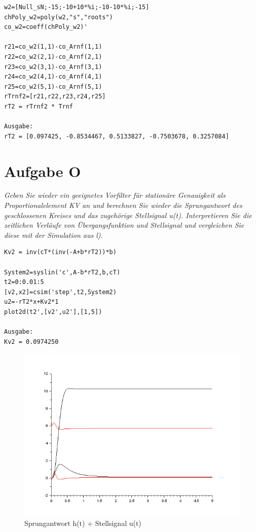 \begin{lstlisting}[caption = Polvorgabe, captionpos = b, label = lst:example]
w2=[Null_sN;-15;-10+10*%i;-10-10*%i;-15]       
chPoly_w2=poly(w2,"s","roots")            
co_w2=coeff(chPoly_w2)'                   
    
r21=co_w2(1,1)-co_Arnf(1,1)
r22=co_w2(2,1)-co_Arnf(2,1)
r23=co_w2(3,1)-co_Arnf(3,1)
r24=co_w2(4,1)-co_Arnf(4,1)
r25=co_w2(5,1)-co_Arnf(5,1)
rTrnf2=[r21,r22,r23,r24,r25]
rT2 = rTrnf2 * Trnf    
    
Ausgabe:
rT2 = [0.097425, -0.8534467, 0.5133827, -0.7503678, 0.3257084]
\end{lstlisting}
\noindent 





\section{Aufgabe O}
\textit{Geben Sie wieder ein geeignetes Vorfilter für stationäre Genauigkeit als Proportionalelement KV an und berechnen Sie wieder die Sprungantwort des geschlossenen Kreises und das zugehörige Stellsignal u(t). Interpretieren Sie die zeitlichen Verläufe von Übergangsfunktion und Stellsignal und vergleichen Sie diese mit der Simulation aus l).}
 
\begin{lstlisting}[caption = Übertragungsfunktion des geschlossenen Regelkreises, captionpos = b, label = lst:example]
Kv2 = inv(cT*(inv(-A+b*rT2))*b)

System2=syslin('c',A-b*rT2,b,cT)
t2=0:0.01:5
[v2,x2]=csim('step',t2,System2)
u2=-rT2*x+Kv2*1
plot2d(t2',[v2',u2'],[1,5])

Ausgabe:
Kv2 = 0.0974250
\end{lstlisting}
\begin{figure}[!ht]
    \centering
    \includegraphics[width=0.8\linewidth]{images/AufgabeOPlot.png}
    \captionsetup{width=1.0\linewidth}
    \caption[Sprungantwort h(t) + Stellsignal u(t) + Vergleich zu Sim L)]{Sprungantwort h(t) + Stellsignal u(t)}
    \label{fig:thkoeln} %
\end{figure}

